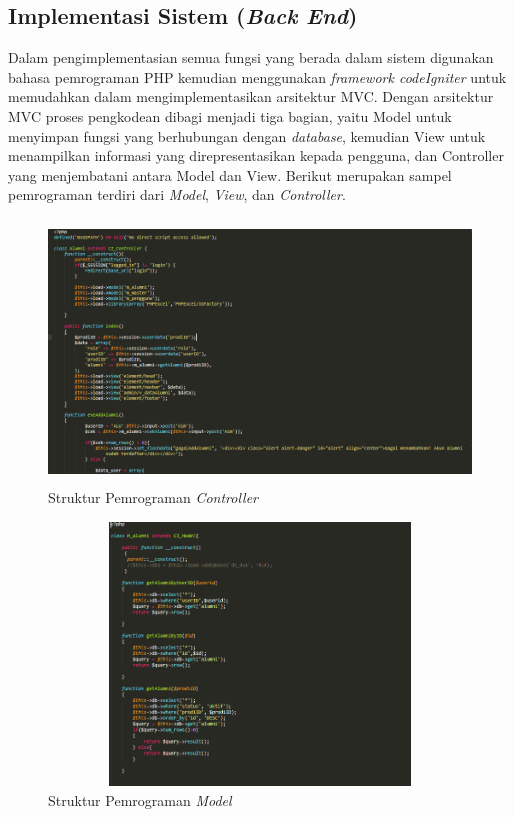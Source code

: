 \subsection{Implementasi Sistem (\textit{Back End})}
Dalam pengimplementasian semua fungsi yang berada dalam sistem digunakan bahasa pemrograman PHP kemudian menggunakan \textit{framework codeIgniter} untuk memudahkan dalam mengimplementasikan arsitektur MVC. Dengan arsitektur MVC proses pengkodean dibagi menjadi tiga bagian, yaitu Model untuk menyimpan fungsi yang berhubungan dengan \textit{database}, kemudian View untuk menampilkan informasi yang direpresentasikan kepada pengguna, dan Controller yang menjembatani antara Model dan View. Berikut merupakan sampel pemrograman terdiri dari \textit{Model}, \textit{View}, dan \textit{Controller}.

\begin{figure}[H]
	\centering
	\includegraphics[width=14cm,height=7cm]{gambar/source_code/c_alumni}
	\caption{Struktur Pemrograman \textit{Controller}}
	\label{sc_cAlumni}
\end{figure}

\begin{figure}[H]
	\centering
	\includegraphics[width=14cm,height=7cm]{gambar/source_code/m_alumni}
	\caption{Struktur Pemrograman \textit{Model}}
	\label{sc_mAlumni}
\end{figure}

